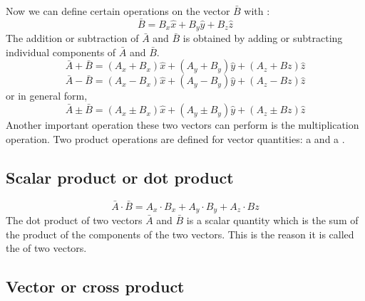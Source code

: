 Now we can define certain operations on the vector $\bar{B}$ with : 
\begin{equation}
\bar{B} = B_{x}\hat{x} + B_{y}\hat{y} + B_{z}\hat{z} 
\end{equation} 
The addition or subtraction of $\bar{A}$ and $\bar{B}$ is obtained by adding or subtracting individual components of $\bar{A}$ and $\bar{B}$.
\begin{equation}
\bar{A} + \bar{B} = (A_{x} + B_{x} )\hat{x} + (A_{y} + B_{y})\hat{y} +(A_{z} + B{z})\hat{z} 
\end{equation}
\begin{equation}
\bar{A} - \bar{B} = (A_{x} - B_{x} )\hat{x} + (A_{y} - B_{y})\hat{y} +(A_{z} - B{z})\hat{z}
\end{equation}
or in general form,
\begin{equation}
\bar{A} \pm \bar{B} = (A_{x} \pm B_{x} )\hat{x} + (A_{y} \pm B_{y})\hat{y} +(A_{z} \pm B{z})\hat{z}
\end{equation}
Another important operation these two vectors can perform is the multiplication operation. Two product operations are defined for vector quantities: a  and a .

\subsection{Scalar product or dot product}
\begin{equation}
\bar{A}\cdot\bar{B} = A_{x}\cdot B_{x} + A_{y}\cdot B_{y} + A_{z}\cdot B{z} 
\end{equation}
The dot product of two vectors $\bar{A}$ and $\bar{B}$ is a scalar quantity which is the sum of the product of the components of the two vectors. This is the reason it is called the  of two vectors.
\subsection{Vector or cross product}

